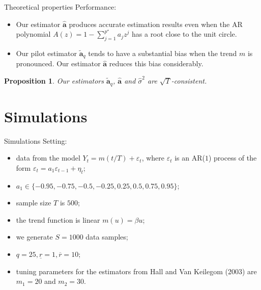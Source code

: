 \documentclass[10pt, handout]{beamer}
\newtheorem{prop}{Proposition}
\begin{document}
\begin{frame}{Theoretical properties}
Performance:
\begin{itemize}
\item Our estimator $\widehat{\boldsymbol{a}}$ produces accurate estimation results even when the AR polynomial $A(z) = 1 - \sum_{j=1}^{p^\star} a_j z^j$ has a root close to the unit circle.\pause
\item Our pilot estimator $\widetilde{\boldsymbol{a}}_q$ tends to have a substantial bias when the trend $m$ is pronounced. Our estimator $\widehat{\boldsymbol{a}}$ reduces this bias considerably.\pause
\end{itemize}
\begin{prop}{}
Our estimators $\widetilde{\boldsymbol{a}}_q$, $\widehat{\boldsymbol{a}}$ and $\widehat{\sigma}^2$ are $\sqrt{T}$-consistent. 
\end{prop}
\end{frame}

\section{Simulations}

\begin{frame}{Simulations}
Setting:
\begin{itemize}
\item data from the model $Y_t = m(t/T) + \varepsilon_t$, where $\varepsilon_t$ is an AR($1$) process of the form $\varepsilon_t = a_1 \varepsilon_{t-1} + \eta_t$;
\item $a_1 \in \{ -0.95, -0.75, -0.5, -0.25, 0.25, 0.5, 0.75, 0.95\}$;
\item sample size $T$ is $500$;
\item the trend function is linear $m(u) = \beta u$;
\item we generate $S = 1000$ data samples;
\item $q=25, \underline{r} = 1, \overline{r} = 10$;
\item tuning parameters for the estimators from Hall and Van Keilegom (2003) are $m_1 = 20$ and $m_2 = 30$. 
\end{itemize}

\end{frame}
\end{document}
